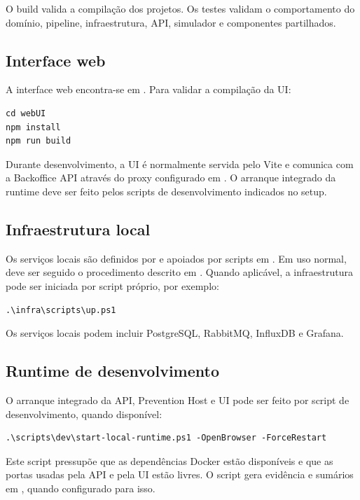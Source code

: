 O build valida a compilação dos projetos. Os testes validam o comportamento do domínio, pipeline, infraestrutura, API, simulador e componentes partilhados.

\subsection{Interface web}

A interface web encontra-se em . Para validar a compilação da UI:

\begin{verbatim}
cd webUI
npm install
npm run build
\end{verbatim}

Durante desenvolvimento, a UI é normalmente servida pelo Vite e comunica com a Backoffice API através do proxy configurado em . O arranque integrado da runtime deve ser feito pelos scripts de desenvolvimento indicados no setup.

\subsection{Infraestrutura local}

Os serviços locais são definidos por  e apoiados por scripts em . Em uso normal, deve ser seguido o procedimento descrito em . Quando aplicável, a infraestrutura pode ser iniciada por script próprio, por exemplo:

\begin{verbatim}
.\infra\scripts\up.ps1
\end{verbatim}

Os serviços locais podem incluir PostgreSQL, RabbitMQ, InfluxDB e Grafana.

\subsection{Runtime de desenvolvimento}

O arranque integrado da API, Prevention Host e UI pode ser feito por script de desenvolvimento, quando disponível:

\begin{verbatim}
.\scripts\dev\start-local-runtime.ps1 -OpenBrowser -ForceRestart
\end{verbatim}

Este script pressupõe que as dependências Docker estão disponíveis e que as portas usadas pela API e pela UI estão livres. O script gera evidência e sumários em , quando configurado para isso.

